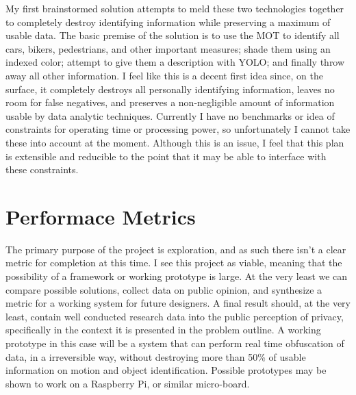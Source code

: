 \documentclass[journal,draftclsnofoot,onecolumn]{IEEEtran}
\begin{document}
    My first brainstormed solution attempts to meld these two technologies 
    together to completely destroy identifying information while preserving 
    a maximum of usable data. The basic premise of the solution is to use 
    the MOT to identify all cars, bikers, pedestrians, and other important 
    measures; shade them using an indexed color; attempt to give them a 
    description with YOLO; and finally throw away all other information. I 
    feel like this is a decent first idea since, on the surface, it 
    completely destroys all personally identifying information, leaves no 
    room for false negatives, and preserves a non-negligible amount of 
    information usable by data analytic techniques.  Currently I have no 
    benchmarks or idea of constraints for operating time or processing power, 
    so unfortunately I cannot take these into account at the moment. Although 
    this is an issue, I feel that this plan is extensible and reducible to 
    the point that it may be able to interface with these constraints. 
    
    \section{Performace Metrics}
    The primary purpose of the project is exploration, and as such there 
    isn’t a clear metric for completion at this time. I see this project as 
    viable, meaning that the possibility of a framework or working prototype 
    is large. At the very least we can compare possible solutions, collect 
    data on public opinion, and synthesize a metric for a working system for 
    future designers. A final result should, at the very least, contain well 
    conducted research data into the public perception of privacy, specifically 
    in the context it is presented in the problem outline. A working prototype 
    in this case will be a system that can perform real time obfuscation of 
    data, in a irreversible way, without destroying more than 50\% of usable 
    information on motion and object identification. Possible prototypes may 
    be shown to work on a Raspberry Pi, or similar micro-board. 
    
    
    
    
    
    
    
    
\end{document}
